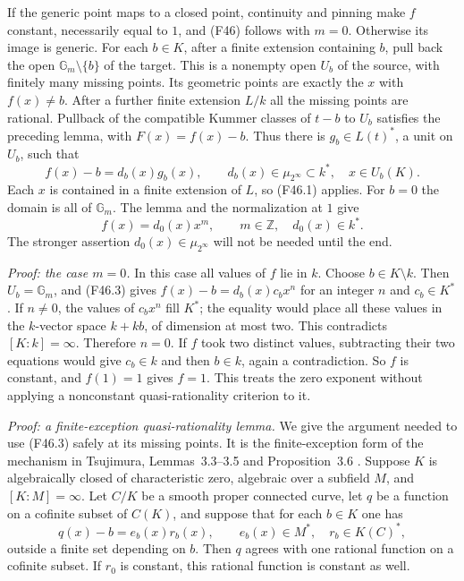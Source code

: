 If the generic point maps to a closed point, continuity and pinning
make $f$ constant, necessarily equal to $1$, and (F46) follows with
$m=0$. Otherwise its image is generic. For each $b\in K$, after a
finite extension containing $b$, pull back the open
$\mathbb G_m\setminus\{b\}$ of the target. This is a nonempty
open $U_b$ of the source, with finitely many missing points. Its
geometric points are exactly the $x$ with $f(x)\ne b$.
After a further finite extension $L/k$ all the missing points are
rational. Pullback of the compatible Kummer classes of $t-b$ to
$U_b$ satisfies the preceding lemma, with $F(x)=f(x)-b$.
Thus there is $g_b\in L(t)^*$, a unit on $U_b$, such that
\[
 f(x)-b=d_b(x)g_b(x),\qquad d_b(x)\in\mu_{2^\infty}\subset k^*,
       \quad x\in U_b(K).                                  \tag{F46.3}
\]
Each $x$ is contained in a finite extension of $L$, so (F46.1)
applies. For $b=0$ the domain is all of $\mathbb G_m$. The lemma
and the normalization at $1$ give
\[
 f(x)=d_0(x)x^m,\qquad m\in\mathbb Z,\quad d_0(x)\in k^*.
                                                               \tag{F46.4}
\]
The stronger assertion $d_0(x)\in\mu_{2^\infty}$ will not be needed
until the end.

\emph{Proof: the case $m=0$.}
In this case all values of $f$ lie in $k$. Choose $b\in K\setminus k$.
Then $U_b=\mathbb G_m$, and (F46.3) gives
$f(x)-b=d_b(x)c_bx^n$ for an integer $n$ and $c_b\in K^*$.
If $n\ne0$, the values of $c_bx^n$ fill $K^*$; the equality would
place all these values in the $k$-vector space $k+kb$, of dimension
at most two. This contradicts $[K:k]=\infty$.
Therefore $n=0$. If $f$ took two distinct values, subtracting their
two equations would give $c_b\in k$ and then $b\in k$, again a
contradiction. So $f$ is constant, and $f(1)=1$ gives $f=1$.
This treats the zero exponent without applying a nonconstant
quasi-rationality criterion to it.

\emph{Proof: a finite-exception quasi-rationality lemma.}
We give the argument needed to use (F46.3) safely at its missing
points. It is the finite-exception form of the mechanism in
Tsujimura, Lemmas~3.3--3.5 and Proposition~3.6
\citep{Tsujimura2022}.
Suppose $K$ is algebraically closed of characteristic zero, algebraic over a subfield $M$,
and $[K:M]=\infty$. Let $C/K$ be a smooth proper connected curve,
let $q$ be a function on a cofinite subset of $C(K)$, and suppose
that for each $b\in K$ one has
\[
 q(x)-b=e_b(x)r_b(x),\qquad e_b(x)\in M^*,\quad r_b\in K(C)^*,
                                                               \tag{F46.5}
\]
outside a finite set depending on $b$. Then $q$ agrees with one
rational function on a cofinite subset. If $r_0$ is constant, this
rational function is constant as well.

